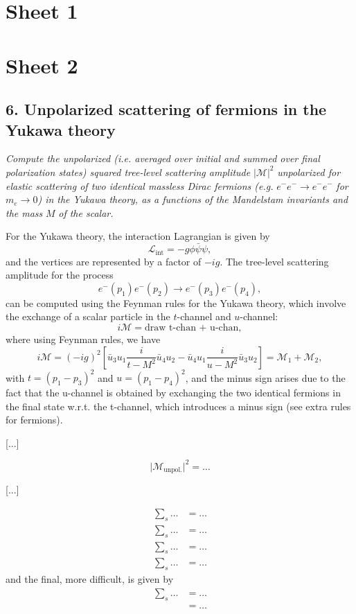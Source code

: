 \section*{Sheet 1}

\section*{Sheet 2}

\subsection*{6. Unpolarized scattering of fermions in the Yukawa theory}

\begin{center}
    \textit{Compute the unpolarized (i.e. averaged over initial and summed over final polarization states) squared tree-level scattering amplitude} \(\vert \mathcal{M} \vert^2\) \textit{unpolarized for elastic scattering of two identical massless Dirac fermions (e.g.} \(e^- e^- \to e^- e^-\) \textit{for} \(m_e \to 0\)\textit{) in the Yukawa theory, as a functions of the Mandelstam invariants and the mass} \(M\) \textit{of the scalar.}
\end{center}

For the Yukawa theory, the interaction Lagrangian is given by
\[
    \mathcal{L}_{\text{int}} = -g \phi \bar{\psi} \psi,
\]
and the vertices are represented by a factor of \(-ig\). The tree-level scattering amplitude for the process
\[
    e^-(p_1) e^-(p_2) \to e^-(p_3) e^-(p_4),
\]
can be computed using the Feynman rules for the Yukawa theory, which involve the exchange of a scalar particle in the \(t\)-channel and \(u\)-channel:
\[
    i \mathcal{M} = \text{draw t-chan + u-chan},
\]
where using Feynman rules, we have
\[
    i \mathcal{M} = (-ig)^2 \left[ \bar{u}_3 u_1 \frac{i}{t - M^2} \bar{u}_4 u_2 - \bar{u}_4 u_1 \frac{i}{u - M^2} \bar{u}_3 u_2 \right] = \mathcal{M}_1 + \mathcal{M}_2,
\]
with \(t = (p_1 - p_3)^2\) and \(u = (p_1 - p_4)^2\), and the minus sign arises due to the fact that the u-channel is obtained by exchanging the two identical fermions in the final state w.r.t. the t-channel, which introduces a minus sign (see extra rules for fermions).

    [...]

\[
    \vert \mathcal{M}_{\text{unpol.}} \vert^2 = \dots
\]

[...]

\[
    \begin{aligned}
        \sum_{s} \dots & = \dots \\
        \sum_{s} \dots & = \dots \\
        \sum_{s} \dots & = \dots \\
        \sum_{s} \dots & = \dots
    \end{aligned}
\]
and the final, more difficult, is given by
\[
    \begin{aligned}
        \sum_{s} \dots & = \dots \\
                       & = \dots
    \end{aligned}
\]

